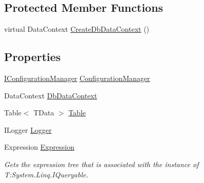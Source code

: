\subsection*{Protected Member Functions}
\begin{DoxyCompactItemize}
\item 
virtual Data\+Context \hyperlink{classCqrs_1_1DataStores_1_1SqlDataStore_a8458af970314deef8eff6a4783b1c46f_a8458af970314deef8eff6a4783b1c46f}{Create\+Db\+Data\+Context} ()
\end{DoxyCompactItemize}
\subsection*{Properties}
\begin{DoxyCompactItemize}
\item 
\hyperlink{interfaceCqrs_1_1Configuration_1_1IConfigurationManager}{I\+Configuration\+Manager} \hyperlink{classCqrs_1_1DataStores_1_1SqlDataStore_a9d720406a3c3abbd8bf1924bd81874ac_a9d720406a3c3abbd8bf1924bd81874ac}{Configuration\+Manager}
\item 
Data\+Context \hyperlink{classCqrs_1_1DataStores_1_1SqlDataStore_aa944d65b800ad9ba7809e96ed2b86f26_aa944d65b800ad9ba7809e96ed2b86f26}{Db\+Data\+Context}
\item 
Table$<$ T\+Data $>$ \hyperlink{classCqrs_1_1DataStores_1_1SqlDataStore_abcd0a88f984a275880f402baadaae2c7_abcd0a88f984a275880f402baadaae2c7}{Table}
\item 
I\+Logger \hyperlink{classCqrs_1_1DataStores_1_1SqlDataStore_a44cd63b587e42b278177070eab8404f7_a44cd63b587e42b278177070eab8404f7}{Logger}
\item 
Expression \hyperlink{classCqrs_1_1DataStores_1_1SqlDataStore_a1fb28f14cf7762331ec9e7d5efe19c75_a1fb28f14cf7762331ec9e7d5efe19c75}{Expression}
\begin{DoxyCompactList}\small\item\em Gets the expression tree that is associated with the instance of T\+:\+System.\+Linq.\+I\+Queryable. \end{DoxyCompactList}\item 

\end{DoxyCompactItemize}
